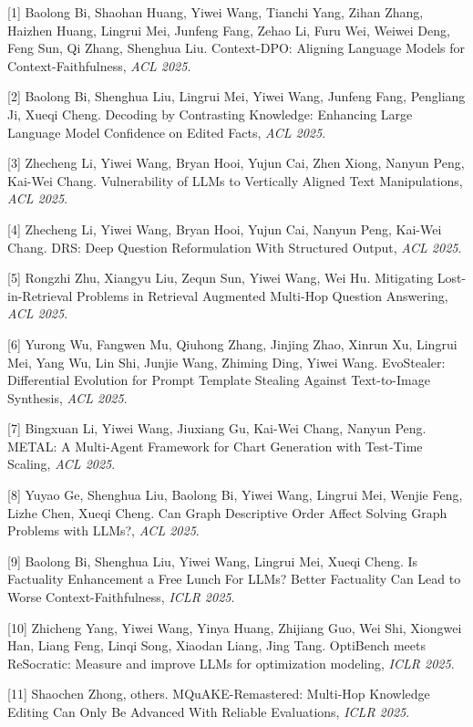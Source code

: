 [1] Baolong Bi, Shaohan Huang, Yiwei Wang, Tianchi Yang, Zihan Zhang, Haizhen Huang, Lingrui Mei, Junfeng Fang, Zehao Li, Furu Wei, Weiwei Deng, Feng Sun, Qi Zhang, Shenghua Liu. Context-DPO: Aligning Language Models for Context-Faithfulness, \textit{ACL 2025}.

[2] Baolong Bi, Shenghua Liu, Lingrui Mei, Yiwei Wang, Junfeng Fang, Pengliang Ji, Xueqi Cheng. Decoding by Contrasting Knowledge: Enhancing Large Language Model Confidence on Edited Facts, \textit{ACL 2025}.

[3] Zhecheng Li, Yiwei Wang, Bryan Hooi, Yujun Cai, Zhen Xiong, Nanyun Peng, Kai-Wei Chang. Vulnerability of LLMs to Vertically Aligned Text Manipulations, \textit{ACL 2025}.

[4] Zhecheng Li, Yiwei Wang, Bryan Hooi, Yujun Cai, Nanyun Peng, Kai-Wei Chang. DRS: Deep Question Reformulation With Structured Output, \textit{ACL 2025}.

[5] Rongzhi Zhu, Xiangyu Liu, Zequn Sun, Yiwei Wang, Wei Hu. Mitigating Lost-in-Retrieval Problems in Retrieval Augmented Multi-Hop Question Answering, \textit{ACL 2025}.

[6] Yurong Wu, Fangwen Mu, Qiuhong Zhang, Jinjing Zhao, Xinrun Xu, Lingrui Mei, Yang Wu, Lin Shi, Junjie Wang, Zhiming Ding, Yiwei Wang. EvoStealer: Differential Evolution for Prompt Template Stealing Against Text-to-Image Synthesis, \textit{ACL 2025}.

[7] Bingxuan Li, Yiwei Wang, Jiuxiang Gu, Kai-Wei Chang, Nanyun Peng. METAL: A Multi-Agent Framework for Chart Generation with Test-Time Scaling, \textit{ACL 2025}.

[8] Yuyao Ge, Shenghua Liu, Baolong Bi, Yiwei Wang, Lingrui Mei, Wenjie Feng, Lizhe Chen, Xueqi Cheng. Can Graph Descriptive Order Affect Solving Graph Problems with LLMs?, \textit{ACL 2025}.

[9] Baolong Bi, Shenghua Liu, Yiwei Wang, Lingrui Mei, Xueqi Cheng. Is Factuality Enhancement a Free Lunch For LLMs? Better Factuality Can Lead to Worse Context-Faithfulness, \textit{ICLR 2025}.

[10] Zhicheng Yang, Yiwei Wang, Yinya Huang, Zhijiang Guo, Wei Shi, Xiongwei Han, Liang Feng, Linqi Song, Xiaodan Liang, Jing Tang. OptiBench meets ReSocratic: Measure and improve LLMs for optimization modeling, \textit{ICLR 2025}.

[11] Shaochen Zhong, others. MQuAKE-Remastered: Multi-Hop Knowledge Editing Can Only Be Advanced With Reliable Evaluations, \textit{ICLR 2025}.


